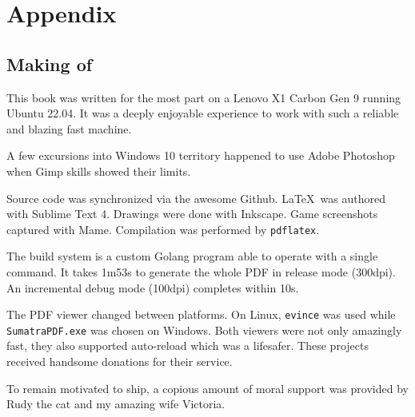 \chapter{Appendix} 

\section{Making of}

This book was written for the most part on a Lenovo X1 Carbon Gen 9 running Ubuntu 22.04. It was a deeply enjoyable experience to work with such a reliable and blazing fast machine. 


A few excursions into Windows 10 territory happened to use Adobe Photoshop when Gimp skills showed their limits. 

Source code was synchronized via the awesome Github. \LaTeX\ was authored with Sublime Text 4. Drawings were done with Inkscape. Game screenshots captured with Mame. Compilation was performed by \texttt{pdflatex}.

The build system is a custom Golang program able to operate with a single  command. It takes 1m53s to generate the whole PDF in release mode (300dpi). An incremental debug mode (100dpi) completes within 10s. 

The PDF viewer changed between platforms. On Linux, \texttt{evince} was used while \texttt{SumatraPDF.exe} was chosen on Windows. Both viewers were not only amazingly fast, they also supported auto-reload which was a lifesafer. These projects received handsome donations for their service.

To remain motivated to ship, a copious amount of moral support was provided by Rudy the cat and my amazing wife Victoria.
